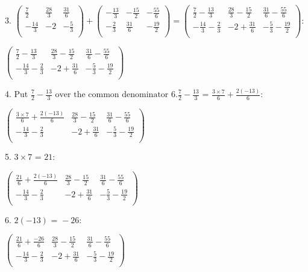 \documentclass{article}
\begin{document}
3. $\left(
\begin{array}{ccc}
\frac{7}{2} & \frac{28}{3} & \frac{31}{6} \\
 -\frac{14}{3} & -2 & -\frac{5}{3} \\
\end{array}
\right)+\left(
\begin{array}{ccc}
-\frac{13}{3} & -\frac{15}{2} & -\frac{55}{6} \\
 -\frac{2}{3} & \frac{31}{6} & -\frac{19}{2} \\
\end{array}
\right)=\left(
\begin{array}{ccc}
\frac{7}{2}-\frac{13}{3} & \frac{28}{3}-\frac{15}{2} & \frac{31}{6}-\frac{55}{6} \\
 -\frac{14}{3}-\frac{2}{3} & -2+\frac{31}{6} & -\frac{5}{3}-\frac{19}{2} \\
\end{array}
\right):$

$\left(
\begin{array}{ccc}
\frac{7}{2}-\frac{13}{3} & \frac{28}{3}-\frac{15}{2} & \frac{31}{6}-\frac{55}{6} \\
 -\frac{14}{3}-\frac{2}{3} & -2+\frac{31}{6} & -\frac{5}{3}-\frac{19}{2} \\
\end{array}
\right)$

4. Put $\frac{7}{2}-\frac{13}{3}\text{ over the common denominator }6. \frac{7}{2}-\frac{13}{3}\text{ = }\frac{3\times 7}{6}+\frac{2 (-13)}{6}$:

$\left(
\begin{array}{ccc}
\frac{3\times 7}{6}+\frac{2 (-13)}{6} & \frac{28}{3}-\frac{15}{2} & \frac{31}{6}-\frac{55}{6} \\
 -\frac{14}{3}-\frac{2}{3} & -2+\frac{31}{6} & -\frac{5}{3}-\frac{19}{2} \\
\end{array}
\right)$

5. $3\times 7\text{ = }21:$

$\left(
\begin{array}{ccc}
\frac{21}{6}+\frac{2 (-13)}{6} & \frac{28}{3}-\frac{15}{2} & \frac{31}{6}-\frac{55}{6} \\
 -\frac{14}{3}-\frac{2}{3} & -2+\frac{31}{6} & -\frac{5}{3}-\frac{19}{2} \\
\end{array}
\right)$

6. $2 (-13)\text{ = }-26:$

$\left(
\begin{array}{ccc}
\frac{21}{6}+\frac{-26}{6} & \frac{28}{3}-\frac{15}{2} & \frac{31}{6}-\frac{55}{6} \\
 -\frac{14}{3}-\frac{2}{3} & -2+\frac{31}{6} & -\frac{5}{3}-\frac{19}{2} \\
\end{array}
\right)$
\end{document}
